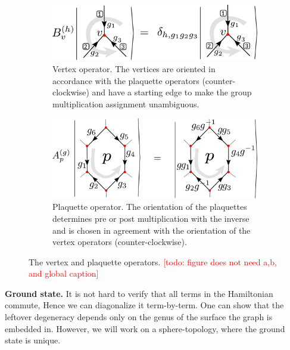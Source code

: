 \documentclass[two column]{article}
\newcommand{\caro}[1]{\textcolor{red}{[#1]}}
\begin{document}
\begin{figure}
    \centering
    \begin{subfigure}[b]{0.45\textwidth}
        \centering
        \includegraphics[width= \linewidth]{Figures/B_ops.pdf}
        \caption{Vertex operator. The vertices are oriented in accordance with the plaquette operators (counter-clockwise) and have a starting edge to make the group multiplication assignment unambiguous.}
        \label{eqn:Bs_def}
    \end{subfigure}\hfill
    \begin{subfigure}[b]{0.45\textwidth}
        \centering
        \includegraphics[width = \linewidth]{Figures/A_ops.pdf}
        \caption{Plaquette operator. The orientation of the plaquettes determines pre or post multiplication with the inverse and is chosen in agreement with the orientation of the vertex operators (counter-clockwise).}
        \label{eqn:As_def}
    \end{subfigure}\hfill
    \caption{The vertex and plaquette operators. \caro{todo: figure does not need a,b, and global caption}}
    \label{fig:vertex_ops}
\end{figure}

\textbf{Ground state.}
It is not hard to verify that all terms in the Hamiltonian commute, Hence we can diagonalize it term-by-term. One can show that the leftover degeneracy depends only on the genus of the surface the graph is embedded in\cite{Kitaev_2003, cui2018topological}. However, we will work on a sphere-topology, where the ground state is unique.

\end{document}
